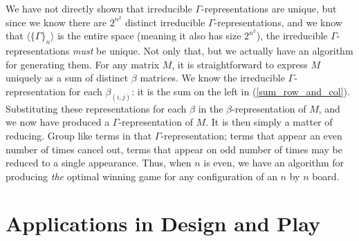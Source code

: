 \documentclass{article}[12pt]
\newcommand{\basis}[2]{\beta_{(#1,#2)}}
\newcommand{\subgroup}[1]{\langle\{\Gamma\}_{#1}\rangle}
\newcommand{\refx}[1]{(\ref{#1})}
\begin{document}
We have not directly shown that irreducible $\Gamma$-representations are unique, but since we know there are $2^{n^2}$ distinct irreducible $\Gamma$-representations, and we know that $\subgroup{n}$ is the entire space (meaning it also has size $2^{n^2}$), the irreducible $\Gamma$-representations \emph{must} be unique.  Not only that, but we actually have an algorithm for generating them.  For any matrix $M$, it is straightforward to express $M$ uniquely as a sum of distinct $\beta$ matrices.  We know the irreducible $\Gamma$-representation for each $\basis{i}{j}$: it is the sum on the left in \refx{sum_row_and_col}.  Substituting these representations for each $\beta$ in the $\beta$-representation of $M$, and we now have produced a $\Gamma$-representation of $M$.  It is then simply a matter of reducing.  Group like terms in that $\Gamma$-representation; terms that appear an even number of times cancel out, terms that appear on odd number of times may be reduced to a single appearance.  Thus, when $n$ is even, we have an algorithm for producing \emph{the} optimal winning game for any configuration of an $n$ by $n$ board. 

\section{Applications in Design and Play}
\label{applications}
\end{document}
